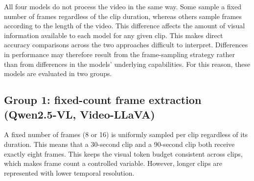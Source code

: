 \documentclass[logo,msc]{infthesis}
\begin{document}
\begin{table}[H]
\centering
\caption{Models evaluated, with language backbone, context window and
video-input mechanism. Group~1 receives a fixed number of extracted
frames; Group~2 receives frames at a duration-proportional rate.}
\label{tab:models}
\small
{}
\end{table}

All four models do not process the video in the same way. Some sample a
fixed number of frames regardless of the clip duration, whereas others
sample frames according to the length of the video. This difference affects
the amount of visual information available to each model for any given
clip. This makes direct accuracy comparisons across the two approaches
difficult to interpret. Differences in performance may therefore result
from the frame-sampling strategy rather than from differences in the
models' underlying capabilities. For this reason, these models are
evaluated in two groups.

\subsection*{Group 1: fixed-count frame extraction (Qwen2.5-VL, Video-LLaVA)}

A fixed number of frames (8 or 16) is uniformly sampled per clip regardless
of its duration. This means that a 30-second clip and a 90-second clip both
receive exactly eight frames. This keeps the visual token budget consistent
across clips, which makes frame count a controlled variable. However,
longer clips are represented with lower temporal resolution.
\end{document}
